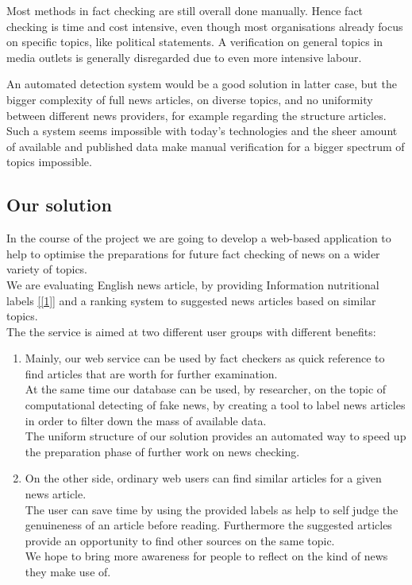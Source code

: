 \documentclass[10pt]{article}
\begin{document}
Most methods in fact checking are still overall done manually. 
Hence fact checking is time and cost intensive, even though most organisations already focus on specific topics, like political statements.
A verification on general topics in media outlets is generally disregarded due to even more intensive labour.

An automated detection system would be a good solution in latter case, but the bigger complexity of full news articles, on diverse topics, and no uniformity between different news providers, for example regarding the structure articles. Such a system seems impossible with today's technologies and the sheer amount of available and published data make manual verification for a bigger spectrum of topics impossible.

\subsection{Our solution}
In the course of the project we are going to develop a web-based application to help to optimise the preparations for future fact checking of news on a wider variety of topics.\\
We are evaluating English news article, by providing \grqq{}Information nutritional labels\grqq{} \ref{[1]} and a ranking system to suggested news articles based on similar topics.\\
The the service is aimed at two different user groups with different benefits:
\begin{enumerate}
\item Mainly, our web service can be used by fact checkers as quick reference to find articles that are worth for further examination. \\
At the same time our database can be used, by researcher, on the topic of computational detecting of fake news, by creating a tool to label news articles in order to filter down the mass of available data.\\
The uniform structure of our solution provides an automated way to speed up the preparation phase of further work on news checking.
\item On the other side, ordinary web users can find similar articles for a given news article.\\
The user can save time by using the provided labels as help to self judge the genuineness of an article before reading.
Furthermore the suggested articles provide an opportunity to find other sources on the same topic.\\
We hope to bring more awareness for people to reflect on the kind of news they make use of.
\end{enumerate}
\end{document}

